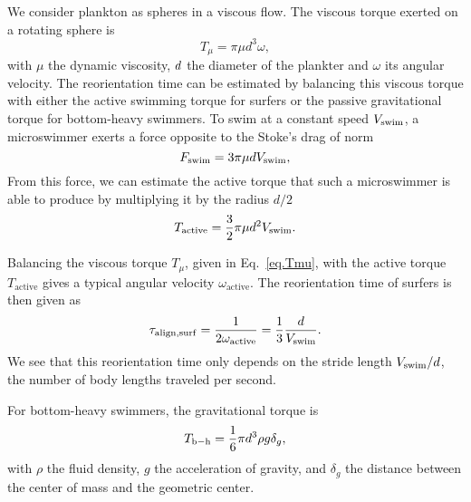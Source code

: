 We consider plankton as spheres in a viscous flow.
The viscous torque exerted on a rotating sphere is \citep{lamb1945hydrodynamics}
\begin{equation}\label{eq.Tmu}
	T_{\mu} = \pi \mu d^3 \omega \mathrm{,}
\end{equation}
with $\mu$ the dynamic viscosity, $d$ the diameter of the plankter and $\omega$ its angular velocity.
The reorientation time can be estimated by balancing this viscous torque with either the active swimming torque for surfers or the passive gravitational torque for bottom-heavy swimmers.
To swim at a constant speed $V_{\mathrm{swim}}$, a microswimmer exerts a force opposite to the Stoke's drag of norm \citep{stokes1851effect}
\begin{equation}
	F_{\mathrm{swim}} = 3 \pi \mu d V_{\mathrm{swim}} \mathrm{,}
\end{equation}
From this force, we can estimate the active torque that such a microswimmer is able to produce by multiplying it by the radius $d/2$
\begin{equation}
	T_{\mathrm{active}} = \frac{3}{2} \pi \mu d^2 V_{\mathrm{swim}} \mathrm{.}
\end{equation}

Balancing the viscous torque $T_{\mu}$, given in Eq.~\eqref{eq.Tmu}, with the active torque $T_{\mathrm{active}}$ gives a typical angular velocity $\omega_{\mathrm{active}}$. The reorientation time of surfers is then given as
\begin{equation}
	\tau_{\mathrm{align}, \mathrm{surf}} = \frac{1}{2\omega_{\mathrm{active}}}=\frac{1}{3} \frac{d}{V_{\mathrm{swim}}}.
\end{equation}
We see that this reorientation time only depends on the stride length $V_{\mathrm{swim}} / d$, the number of body lengths traveled per second.

For bottom-heavy swimmers, the gravitational torque is
\begin{equation}
	T_{\mathrm{b-h}} = \frac{1}{6} \pi d^3 \rho g \delta_{g} \mathrm{,}
\end{equation}
with $\rho$ the fluid density, $g$ the acceleration of gravity, and $\delta_{g}$ the distance between the center of mass and the geometric center.

